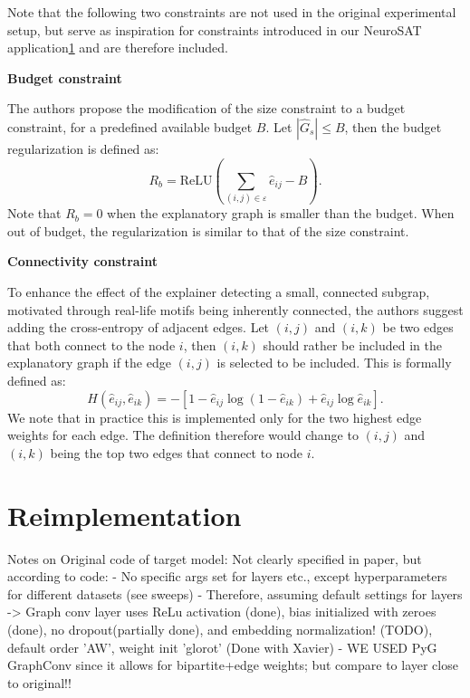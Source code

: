 Note that the following two constraints are not used in the original experimental setup, but serve as inspiration for constraints introduced in our NeuroSAT application\ref{} and are therefore included. \bigskip

\textbf{Budget constraint}

The authors propose the modification of the size constraint to a budget constraint, for a predefined available budget $B$. Let $|\hat{G}_s| \leq B$, then the budget regularization is defined as:
\begin{equation}
    R_b = \text{ReLU}(\sum_{(i,j)\in \varepsilon}\hat{e}_{ij}-B).
\end{equation}
Note that $R_b = 0$ when the explanatory graph is smaller than the budget. When out of budget, the regularization is similar to that of the size constraint. \bigskip

\textbf{Connectivity constraint}

To enhance the effect of the explainer detecting a small, connected subgrap, motivated through real-life motifs being inherently connected, the authors suggest adding the cross-entropy of adjacent edges. Let $(i,j)$ and $(i,k)$ be two edges that both connect to the node $i$, then $(i,k)$ should rather be included in the explanatory graph if the edge $(i,j)$ is selected to be included. This is formally defined as:
\begin{equation}
    H(\hat{e}_{ij},\hat{e}_{ik}) = -[1-\hat{e}_{ij}\log(1-\hat{e}_{ik})+\hat{e}_{ij}\log \hat{e}_{ik}].
\end{equation}
We note that in practice this is implemented only for the two highest edge weights for each edge. The definition therefore would change to $(i,j)$ and $(i,k)$ being the top two edges that connect to node $i$.


\section{Reimplementation}
Notes on Original code of target model: Not clearly specified in paper, but according to code:
- No specific args set for layers etc., except hyperparameters for different datasets (see sweeps)
- Therefore, assuming default settings for layers -> Graph conv layer uses ReLu activation (done), bias initialized with zeroes (done), no dropout(partially done), and embedding normalization! (TODO), default order 'AW', weight init 'glorot' (Done with Xavier)
- WE USED PyG GraphConv since it allows for bipartite+edge weights; but compare to layer close to original!!\bigskip

